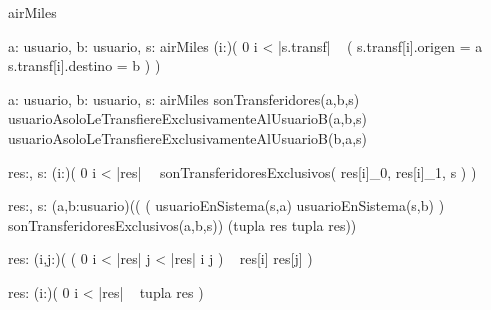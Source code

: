 \documentclass[11pt,a4paper]{article}
\newcommand{\Tipo}[1]{\mathsf{#1}}
\begin{document}
\begin{tad}{airMiles}
\bigskip


    {a: usuario, b: usuario, s: airMiles}
{
    (\forall i:\Z)(
        0 \leq i < |s.transf|
        \ \implicaLuego
        (
            s.transf[i].origen = a
            \implica
            s.transf[i].destino = b
        )
    )
}

\bigskip


    {a: usuario, b: usuario, s: airMiles}
{
    sonTransferidores(a,b,s)
    \ \land \\
    usuarioAsoloLeTransfiereExclusivamenteAlUsuarioB(a,b,s)
    \ \land \\
    usuarioAsoloLeTransfiereExclusivamenteAlUsuarioB(b,a,s)
}

\bigskip


    {res:,
     s:\Tipo{airMiles}}
{
    (\forall i:\Z)(
        0 \leq i < |res|
        \ \implicaLuego \
        sonTransferidoresExclusivos(
            res[i]_0,
            res[i]_1,
            s
        )
    )
}

\bigskip


    {res:,
     s:\Tipo{airMiles}}
{
    (\forall a,b:usuario)((
        (
            usuarioEnSistema(s,a)
            \land
            usuarioEnSistema(s,b)
        )
         \yLuego \\
            sonTransferidoresExclusivos(a,b,s))
            \implicaLuego
            (tupla \in res \lor tupla \in res))}

\bigskip


    {res:}
{
    (\forall i,j:\Z)(
        (
            0 \leq i < |res|
             \leq j < |res|
            \land
            i \neq j
        )
        \ \implicaLuego
        res[i] \neq res[j]
    )
}

\bigskip


    {res:}
{
    (\forall i:\Z)(
        0 \leq i < |res|
        \ \implicaLuego
        tupla \notin res
    )}



\end{tad}
\end{document}
